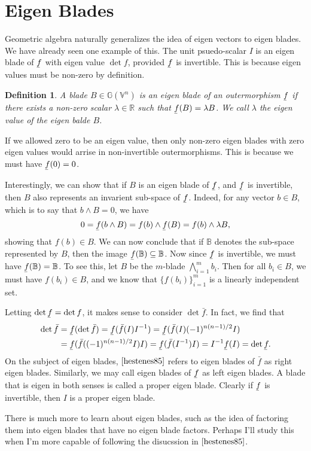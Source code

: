 \documentclass[12pt]{article}
\newcommand{\G}{\mathbb{G}}
\newcommand{\V}{\mathbb{V}}
\newcommand{\R}{\mathbb{R}}
\newcommand{\B}{\mathbb{B}}
\newcommand{\uf}{\underaccent{\bar}{f}}
\newcommand{\of}{\bar{f}}
\newtheorem{definition}{Definition}[section]
\begin{document}
\section{Eigen Blades}

Geometric algebra naturally generalizes the idea of eigen vectors to eigen blades.  We have already
seen one example of this.  The unit psuedo-scalar $I$ is an eigen blade of $\uf$ with eigen value $\det f$,
provided $\uf$ is invertible.  This is because eigen values must be non-zero by definition.
\begin{definition}
A blade $B\in\G(\V^n)$ is an eigen blade of an outermorphism $\uf$ if there exists a non-zero scalar $\lambda\in\R$
such that $\uf(B)=\lambda B$.  We call $\lambda$ the eigen value of the eigen balde $B$.
\end{definition}
If we allowed zero to be an eigen value, then only non-zero eigen blades with zero eigen values
would arrise in non-invertible outermorphisms.  This is because we must have $\uf(0)=0$.

Interestingly, we can show that if $B$ is an eigen blade of $\uf$, and $\uf$ is invertible, then $B$ also represents
an invarient sub-space of $\uf$.  Indeed, for any vector $b\in B$, which is to say that $b\wedge B=0$, we have
\begin{equation*}
0 = \uf(b\wedge B) = f(b)\wedge\uf(B) = f(b)\wedge \lambda B,
\end{equation*}
showing that $f(b)\in B$.  We can now conclude that if $\B$ denotes the sub-space represented
by $B$, then the image $\uf(\B)\subseteq \B$.  Now since $\uf$ is invertible, we must have $\uf(\B)=\B$.
To see this, let $B$ be the $m$-blade $\bigwedge_{i=1}^m b_i$.  Then for all $b_i\in B$, we
must have $f(b_i)\in B$, and we know that $\{f(b_i)\}_{i=1}^m$ is a linearly independent set.

Letting $\det\uf=\det f$, it makes sense to consider $\det\of$.  In fact, we find that
\begin{align*}
\det\of &= \uf(\det\of) = \uf(\of(I) I^{-1}) = \uf(\of(I)(-1)^{n(n-1)/2}I) \\
 &= \uf(\of((-1)^{n(n-1)/2}I) I) = \uf(\of(I^{-1}) I) = I^{-1}\uf(I) = \det\uf.
\end{align*}
On the subject of eigen blades, $\cite{hestenes85}$ refers to eigen blades of $\of$ as right eigen blades.
Similarly, we may call eigen blades of $\uf$ as left eigen blades.  A blade that is eigen in both senses
is called a proper eigen blade.  Clearly if $\uf$ is invertible, then $I$ is a proper eigen blade.

There is much more to learn about eigen blades, such as the idea of factoring them into
eigen blades that have no eigen blade factors.  Perhaps I'll study this when I'm more capable
of following the disucssion in $\cite{hestenes85}$.




\end{document}
